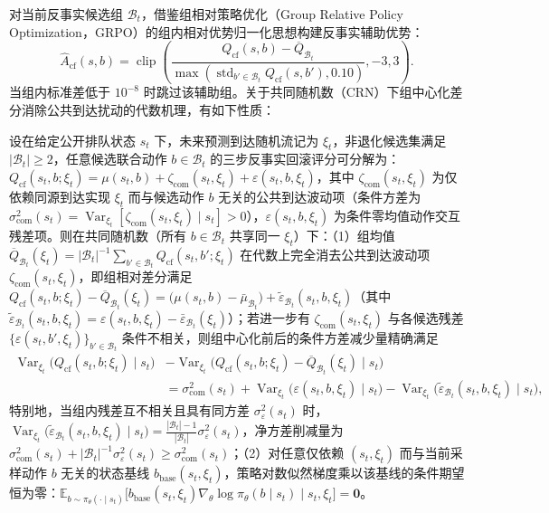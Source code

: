 对当前反事实候选组 $\mathcal B_t$，借鉴组相对策略优化（Group Relative Policy Optimization，GRPO）的组内相对优势归一化思想\cite{shao2024deepseekmath}构建反事实辅助优势：
\begin{equation}
 \widehat A_{\mathrm{cf}}(s,b)=\operatorname{clip}\left(
 \frac{Q_{\mathrm{cf}}(s,b)-\overline Q_{\mathcal B_t}}
 {\max(\operatorname{std}_{b'\in\mathcal B_t}Q_{\mathrm{cf}}(s,b'),0.10)},-3,3\right).
 \label{eq:ch5-cf-adv}
\end{equation}
当组内标准差低于 $10^{-8}$ 时跳过该辅助组。关于共同随机数（CRN）下组中心化差分消除公共到达扰动的代数机理，有如下性质：

\begin{theorem}[共同随机数反事实组中心化的公共加性扰动消去与状态基线恒等式]
设在给定公开排队状态 $s_t$ 下，未来预测到达随机流记为 $\xi_t$，非退化候选集满足 $|\mathcal{B}_t|\geq 2$，任意候选联合动作 $b\in\mathcal{B}_t$ 的三步反事实回滚评分可分解为：$Q_{\mathrm{cf}}(s_t,b;\xi_t)=\mu(s_t,b)+\zeta_{\mathrm{com}}(s_t,\xi_t)+\varepsilon(s_t,b,\xi_t)$，其中 $\zeta_{\mathrm{com}}(s_t,\xi_t)$ 为仅依赖同源到达实现 $\xi_t$ 而与候选动作 $b$ 无关的公共到达波动项（条件方差为 $\sigma_{\mathrm{com}}^2(s_t)=\operatorname{Var}_{\xi_t}[\zeta_{\mathrm{com}}(s_t,\xi_t)\mid s_t]>0$），$\varepsilon(s_t,b,\xi_t)$ 为条件零均值动作交互残差项。则在共同随机数（所有 $b\in\mathcal{B}_t$ 共享同一 $\xi_t$）下：（1）组均值 $\overline{Q}_{\mathcal{B}_t}(\xi_t)=|\mathcal{B}_t|^{-1}\sum_{b'\in\mathcal{B}_t}Q_{\mathrm{cf}}(s_t,b';\xi_t)$ 在代数上完全消去公共到达波动项 $\zeta_{\mathrm{com}}(s_t,\xi_t)$，即组相对差分满足 $Q_{\mathrm{cf}}(s_t,b;\xi_t)-\overline{Q}_{\mathcal{B}_t}(\xi_t)=\big(\mu(s_t,b)-\bar{\mu}_{\mathcal{B}_t}\big)+\allowbreak\tilde{\varepsilon}_{\mathcal{B}_t}(s_t,b,\xi_t)$（其中 $\tilde{\varepsilon}_{\mathcal{B}_t}(s_t,b,\xi_t)=\varepsilon(s_t,b,\xi_t)-\bar{\varepsilon}_{\mathcal{B}_t}(\xi_t)$）；若进一步有 $\zeta_{\mathrm{com}}(s_t,\xi_t)$ 与各候选残差 $\{\varepsilon(s_t,b',\xi_t)\}_{b'\in\mathcal{B}_t}$ 条件不相关，则组中心化前后的条件方差减少量精确满足
\[
\begin{aligned}
\operatorname{Var}_{\xi_t}\!\big(Q_{\mathrm{cf}}(s_t,b;\xi_t)\mid s_t\big)&-\operatorname{Var}_{\xi_t}\!\big(Q_{\mathrm{cf}}(s_t,b;\xi_t)-\overline{Q}_{\mathcal{B}_t}(\xi_t)\mid s_t\big)\\
&=\sigma_{\mathrm{com}}^2(s_t)+\operatorname{Var}_{\xi_t}\!\big(\varepsilon(s_t,b,\xi_t)\mid s_t\big)-\operatorname{Var}_{\xi_t}\!\big(\tilde{\varepsilon}_{\mathcal{B}_t}(s_t,b,\xi_t)\mid s_t\big),
\end{aligned}
\]
特别地，当组内残差互不相关且具有同方差 $\sigma_\varepsilon^2(s_t)$ 时，$\operatorname{Var}_{\xi_t}\big(\tilde{\varepsilon}_{\mathcal{B}_t}(s_t,b,\xi_t)\mid s_t\big)=\frac{|\mathcal{B}_t|-1}{|\mathcal{B}_t|}\sigma_\varepsilon^2(s_t)$，净方差削减量为 $\sigma_{\mathrm{com}}^2(s_t)+|\mathcal{B}_t|^{-1}\sigma_\varepsilon^2(s_t)\geq\sigma_{\mathrm{com}}^2(s_t)$；（2）对任意仅依赖 $(s_t,\xi_t)$ 而与当前采样动作 $b$ 无关的状态基线 $b_{\mathrm{base}}(s_t,\xi_t)$，策略对数似然梯度乘以该基线的条件期望恒为零：$\mathbb{E}_{b\sim\pi_\theta(\cdot\mid s_t)}\big[b_{\mathrm{base}}(s_t,\xi_t)\nabla_\theta\log\pi_\theta(b\mid s_t)\mid s_t,\xi_t\big]=\mathbf{0}$。
\end{theorem}

